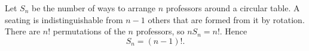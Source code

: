 Let $S_n$ be the number of ways to arrange $n$ professors around a circular table.
A seating is indistinguishable from $n-1$ others that are formed from it by rotation.
There are $n!$ permutations of the $n$ professors, so $nS_n=n!$.
Hence
\[
    S_n = (n-1)!.
\]
